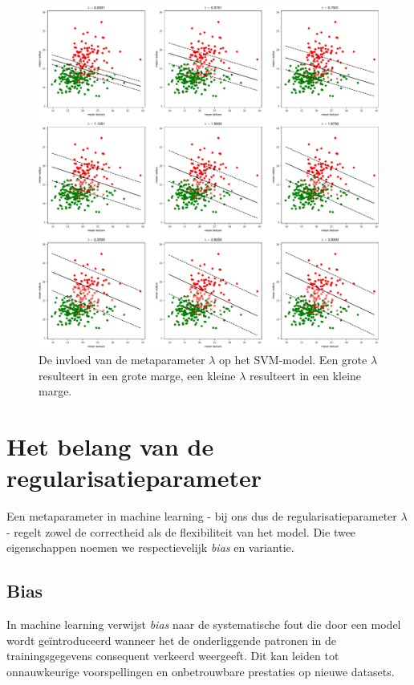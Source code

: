 \documentclass[twoside, kulak]{kulakreport}
\begin{document}
	\begin{figure}
		\centering
		\includegraphics[width=.9\textwidth]{lambda}
		\caption{De invloed van de metaparameter \(\lambda\) op het SVM-model. Een grote \(\lambda\) resulteert in een grote marge, een kleine \(\lambda\) resulteert in een kleine marge.}
		\label{fig:lambda}
	\end{figure}
	
	\section{Het belang van de regularisatieparameter}
	
	Een metaparameter in machine learning - bij ons dus de regularisatieparameter \(\lambda\) - regelt zowel de correctheid als de flexibiliteit van het model. Die twee eigenschappen noemen we respectievelijk \textit{bias} en variantie.
	
	\subsection{Bias}
	
	In machine learning verwijst \textit{bias} naar de systematische fout die door een model wordt geïntroduceerd wanneer het de onderliggende patronen in de trainingsgegevens consequent verkeerd weergeeft. Dit kan leiden tot onnauwkeurige voorspellingen en onbetrouwbare prestaties op nieuwe datasets. 
	
\end{document}
